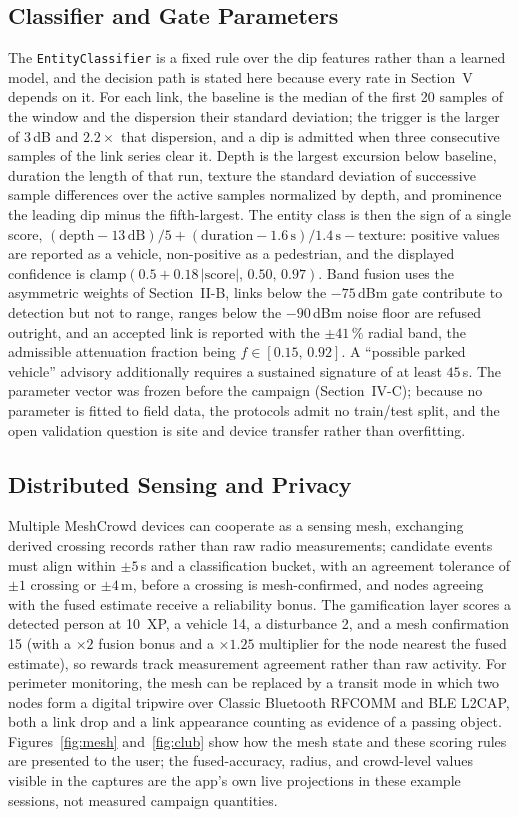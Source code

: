 \documentclass[journal,10pt]{IEEEtran}
\begin{document}
\subsection{Classifier and Gate Parameters}
The \texttt{EntityClassifier} is a fixed rule over the dip features rather than a
learned model, and the decision path is stated here because every rate in
Section~V depends on it. For each link, the baseline is the median of the first
20 samples of the window and the dispersion their standard deviation; the trigger
is the larger of $3$\,dB and $2.2\times$ that dispersion, and a dip is admitted
when three consecutive samples of the link series clear it. Depth is the largest
excursion below baseline, duration the length of that run, texture the standard
deviation of successive sample differences over the active samples normalized by
depth, and prominence the leading dip minus the fifth-largest. The entity class
is then the sign of a single score,
$(\text{depth}-13\,\mathrm{dB})/5+(\text{duration}-1.6\,\mathrm{s})/1.4\,\mathrm{s}-\text{texture}$:
positive values are reported as a vehicle, non-positive as a pedestrian, and the
displayed confidence is $\mathrm{clamp}(0.5+0.18\,|\text{score}|,\,0.50,\,0.97)$.
Band fusion uses the asymmetric weights of Section~II-B, links below the
$-75$\,dBm gate contribute to detection but not to range, ranges below the
$-90$\,dBm noise floor are refused outright, and an accepted link is reported
with the $\pm41$\,\% radial band, the admissible attenuation fraction being
$f \in [0.15,\,0.92]$. A ``possible parked vehicle'' advisory
additionally requires a sustained signature of at least $45$\,s. The parameter
vector was frozen before the campaign (Section~IV-C); because no parameter is
fitted to field data, the protocols admit no train/test split, and the open
validation question is site and device transfer rather than overfitting.

\subsection{Distributed Sensing and Privacy}
\label{sec:meshdesign}
Multiple MeshCrowd devices can cooperate as a sensing mesh, exchanging
derived crossing records rather than raw radio measurements; candidate events
must align within $\pm5$\,s and a classification bucket, with an agreement
tolerance of $\pm1$ crossing or $\pm4$\,m, before a crossing is
mesh-confirmed, and nodes agreeing with the fused estimate receive a
reliability bonus. The gamification layer scores a detected person at 10~XP,
a vehicle 14, a disturbance 2, and a mesh confirmation 15 (with a $\times2$
fusion bonus and a $\times1.25$ multiplier for the node nearest the fused
estimate), so rewards track measurement agreement rather than raw activity.
For perimeter monitoring, the mesh can be replaced by a transit mode in
which two nodes form a digital tripwire over Classic Bluetooth RFCOMM and
BLE L2CAP, both a link drop and a link appearance counting as evidence of a
passing object. Figures~\ref{fig:mesh} and~\ref{fig:club} show how the mesh
state and these scoring rules are presented to the user; the fused-accuracy,
radius, and crowd-level values visible in the captures are the app's own live
projections in these example sessions, not measured campaign quantities.
\end{document}
